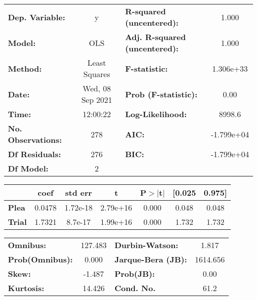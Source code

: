 \begin{center}
\begin{tabular}{lclc}
\toprule
\textbf{Dep. Variable:}    &        y         & \textbf{  R-squared (uncentered):}      &     1.000   \\
\textbf{Model:}            &       OLS        & \textbf{  Adj. R-squared (uncentered):} &     1.000   \\
\textbf{Method:}           &  Least Squares   & \textbf{  F-statistic:       }          & 1.306e+33   \\
\textbf{Date:}             & Wed, 08 Sep 2021 & \textbf{  Prob (F-statistic):}          &     0.00    \\
\textbf{Time:}             &     12:00:22     & \textbf{  Log-Likelihood:    }          &    8998.6   \\
\textbf{No. Observations:} &         278      & \textbf{  AIC:               }          & -1.799e+04  \\
\textbf{Df Residuals:}     &         276      & \textbf{  BIC:               }          & -1.799e+04  \\
\textbf{Df Model:}         &           2      & \textbf{                     }          &             \\
\bottomrule
\end{tabular}
\begin{tabular}{lcccccc}
               & \textbf{coef} & \textbf{std err} & \textbf{t} & \textbf{P$> |$t$|$} & \textbf{[0.025} & \textbf{0.975]}  \\
\midrule
\textbf{Plea}  &       0.0478  &     1.72e-18     &  2.79e+16  &         0.000        &        0.048    &        0.048     \\
\textbf{Trial} &       1.7321  &      8.7e-17     &  1.99e+16  &         0.000        &        1.732    &        1.732     \\
\bottomrule
\end{tabular}
\begin{tabular}{lclc}
\textbf{Omnibus:}       & 127.483 & \textbf{  Durbin-Watson:     } &    1.817  \\
\textbf{Prob(Omnibus):} &   0.000 & \textbf{  Jarque-Bera (JB):  } & 1614.656  \\
\textbf{Skew:}          &  -1.487 & \textbf{  Prob(JB):          } &     0.00  \\
\textbf{Kurtosis:}      &  14.426 & \textbf{  Cond. No.          } &     61.2  \\
\bottomrule
\end{tabular}
\end{center}
